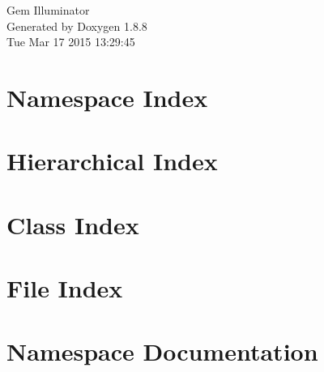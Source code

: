 \documentclass[twoside]{book}
\newcommand{\+}{\discretionary{\mbox{\scriptsize$\hookleftarrow$}}{}{}}
\newcommand{\clearemptydoublepage}{%
  \newpage{\pagestyle{empty}\cleardoublepage}%
}
\begin{document}
\hypersetup{pageanchor=false,
             bookmarks=true,
             bookmarksnumbered=true,
             pdfencoding=unicode
            }
\begin{titlepage}
\vspace*{7cm}
\begin{center}%
{\Large Gem Illuminator }\\
\vspace*{1cm}
{\large Generated by Doxygen 1.8.8}\\
\vspace*{0.5cm}
{\small Tue Mar 17 2015 13:29:45}\\
\end{center}
\end{titlepage}
\clearemptydoublepage
\tableofcontents
\clearemptydoublepage
{}
\hypersetup{pageanchor=true}

\chapter{Namespace Index}

\chapter{Hierarchical Index}

\chapter{Class Index}

\chapter{File Index}

\chapter{Namespace Documentation}





\end{document}
